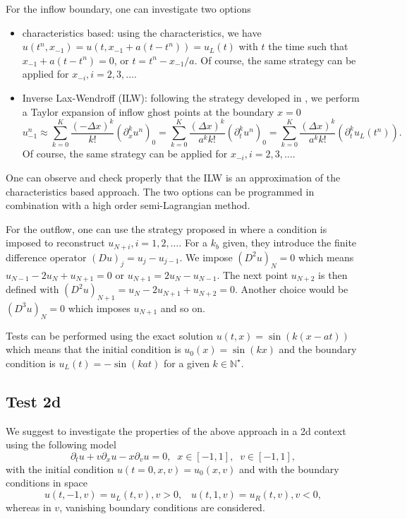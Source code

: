 \documentclass[12pt,english]{article}
\theoremstyle{plain}\newtheorem{theorem}{Theorem}[section]
\theoremstyle{plain}\newtheorem{corollary}{Corollary}[section]
\theoremstyle{plain}\newtheorem{lemma}{Lemma}[section]
\begin{document}
For the inflow boundary, one can investigate two options 
\begin{itemize}
\item characteristics based: using the characteristics, we have $u(t^n, x_{-1}) = u(t, x_{-1}+a(t-t^n)) = u_L(t)$ with $t$ the time such that 
$x_{-1} + a(t-t^n) = 0$, or $t=t^n-x_{-1}/a$. Of course, the same strategy can be applied for $x_{-i}, i=2, 3, ...$.  
\item Inverse Lax-Wendroff (ILW): following the strategy developed in \cite{boutin, coulombel}, we perform a Taylor expansion 
of inflow ghost points at the boundary $x=0$ 
$$
u_{-1}^n \approx \sum_{k=0}^K \frac{(-\Delta x)^k}{k!}(\partial_x^k u^n)_0 = \sum_{k=0}^K \frac{(\Delta x)^k}{a^k k!}(\partial_t^k u^n)_0 
= \sum_{k=0}^K \frac{(\Delta x)^k}{a^k k!}(\partial_t^k u_L(t^n)). 
$$ 
Of course, the same strategy can be applied for $x_{-i}, i=2, 3, ...$.  
\end{itemize}
One can observe and check properly that the ILW is an approximation of the characteristics based approach. The two options can be programmed in combination with a high order semi-Lagrangian method. 

For the outflow, one can use the strategy proposed in \cite{boutin, coulombel} where a condition is imposed to reconstruct 
$u_{N+i}, i=1, 2, \dots$. For a $k_b$ given, they introduce the finite difference operator $(D u)_j = u_j-u_{j-1}$. 
We impose $(D^2 u)_N=0$ which means $u_{N-1}-2u_N+u_{N+1}=0$ or $u_{N+1}=2u_N-u_{N-1}$. 
The next point $u_{N+2}$ is then defined with $(D^2 u)_{N+1}=u_{N}-2u_{N+1}+u_{N+2}=0$. 
Another choice would be $(D^3 u)_N=0$ which imposes $u_{N+1}$ and so on.  

Tests can be performed using the exact solution $u(t, x)=\sin(k(x-at))$ which means 
that the initial condition is  $u_0(x)=\sin(kx)$ and the boundary condition is $u_L(t)=-\sin(kat)$ 
for a given $k\in\mathbb{N}^\star$. 


\subsection{Test 2d}
We suggest to investigate the properties of the above approach in a 2d context using the following model 
$$
\partial_t u +v\partial_x u - x\partial_v u = 0, \;\; x\in [-1, 1], \;\; v\in [-1, 1], 
$$
with the initial condition $u(t=0, x, v) = u_0(x, v)$ and with the boundary conditions in space 
$$
u(t, -1, v)=u_L(t, v), v>0, \;\;\; u(t, 1, v)=u_R(t, v), v<0, 
$$
whereas in $v$, vanishing boundary conditions are considered. 
\end{document}
